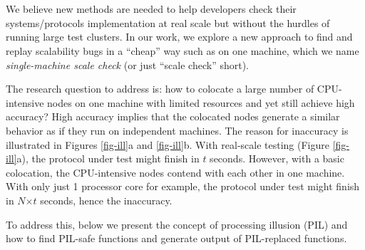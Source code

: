 


\section{\sck}
\label{sec-sck}


We believe new methods are needed to help developers check their
systems/protocols implementation at real scale but without the hurdles of
running large test clusters.  
%
In our work, we explore a new approach to find and replay scalability bugs
in a ``cheap'' way such as on one machine, which we name {\em
  single-machine scale check} (or just ``scale check'' short).


The research question to address is: how to colocate a large number of
CPU-intensive nodes on one machine with limited resources and yet still
achieve high accuracy?
%
High accuracy implies that the colocated nodes generate a similar behavior
as if they run on independent machines.
%
The reason for inaccuracy is illustrated in Figures \ref{fig-ill}a
and \ref{fig-ill}b.
%
With real-scale testing (Figure \ref{fig-ill}a), the protocol under test
might finish in $t$ seconds.  However, with a basic colocation, the
CPU-intensive nodes contend with each other in one machine.  With only
just 1 processor core for example, the protocol under test might finish in
$N$$\times$$t$ seconds, hence the inaccuracy.
%

To address this, below we present the concept of processing
illusion (PIL) and how to find PIL-safe functions and generate output of
PIL-replaced functions.







%





